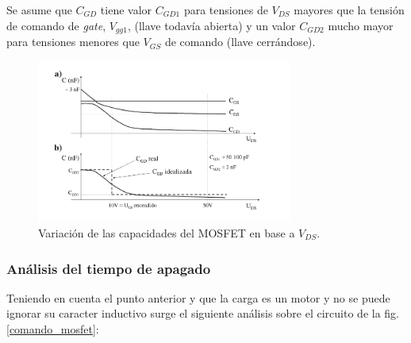 \documentclass[10pt,a4paper]{article}
\begin{document}
Se asume que $C_{GD}$ tiene valor $C_{GD1}$ para tensiones de $V_{DS}$ mayores
que la tensión de comando de \emph{gate}, $V_{gg1}$, (llave todavía abierta) y
un valor $C_{GD2}$ mucho mayor para tensiones menores que $V_{GS}$ de comando
(llave cerrándose)\cite{Mohan1989}.

\begin{figure}[h!]
	\begin{center}
		\includegraphics[width=0.75\textwidth]{Capacitor_vs_Vds.pdf}
		\caption{Variación de las capacidades del MOSFET en base a $V_{DS}$.}
		\label{aprox_CGD}
	\end{center}
\end{figure}
\FloatBarrier

\subsubsection{Análisis del tiempo de apagado}

Teniendo en cuenta el punto anterior y que la carga es un motor y no se puede
ignorar su caracter inductivo surge el siguiente análisis sobre el circuito de
la fig. \ref{comando_mosfet}:
\end{document}
